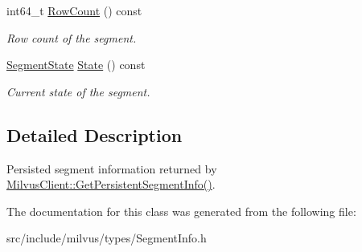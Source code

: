 \begin{DoxyCompactItemize}
int64\+\_\+t \hyperlink{classmilvus_1_1_segment_info_adcf9ed245a2c6f52355e1c61b7d9cf9e}{Row\+Count} () const
\begin{DoxyCompactList}\small\item\em Row count of the segment. \end{DoxyCompactList}\item 
\mbox{\label{classmilvus_1_1_segment_info_a5b99f45e8128d969f3a40bf66857a31d}} 
\hyperlink{namespacemilvus_abe8ed76f6dc4b1b12a59f67fcef5afed}{Segment\+State} \hyperlink{classmilvus_1_1_segment_info_a5b99f45e8128d969f3a40bf66857a31d}{State} () const
\begin{DoxyCompactList}\small\item\em Current state of the segment. \end{DoxyCompactList}\end{DoxyCompactItemize}


\subsection{Detailed Description}
Persisted segment information returned by \hyperlink{classmilvus_1_1_milvus_client_a383e2ef16d4add6af450170775869604}{Milvus\+Client\+::\+Get\+Persistent\+Segment\+Info()}. 

The documentation for this class was generated from the following file\+:\begin{DoxyCompactItemize}
\item 
src/include/milvus/types/Segment\+Info.\+h\end{DoxyCompactItemize}
